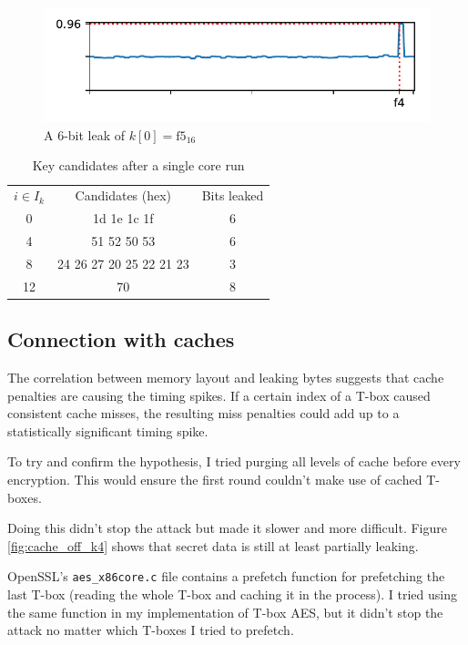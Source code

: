 \documentclass[thesis=B,english]{FITthesis}[2019/03/06]
\begin{document}
\begin{figure}
	\centering
	\includegraphics{broad_pool_example.pdf}
	\caption{A 6-bit leak of $k[0] = \text{f5}_{16}$}
	\label{fig:limited_corr_byte}
\end{figure}

\begin{table}
	\centering
	\begin{tabular}{c|c|c}
		$i \in I_k$ & Candidates (hex) & Bits leaked \\
		0 & 1d 1e 1c 1f & 6 \\
		4 & 51 52 50 53 & 6 \\
		8 & 24 26 27 20 25 22 21 23 & 3 \\
		12 & 70 & 8
	\end{tabular}
	
	\caption{Key candidates after a single core run}
	\label{tbl:leaking_bits}
\end{table}

\subsection{Connection with caches}
The correlation between memory layout and leaking bytes suggests that cache penalties are causing the timing spikes.
If a certain index of a T-box caused consistent cache misses, the resulting miss penalties could add up to a statistically significant timing spike.

To try and confirm the hypothesis, I tried purging all levels of cache before every encryption.
This would ensure the first round couldn't make use of cached T-boxes.

Doing this didn't stop the attack but made it slower and more difficult. 
Figure \ref{fig:cache_off_k4} shows that secret data is still at least partially leaking.

OpenSSL's \verb'aes_x86core.c' file contains a prefetch function for prefetching the last T-box (reading the whole T-box and caching it in the process).
I tried using the same function in my implementation of T-box AES, but it didn't stop the attack no matter which T-boxes I tried to prefetch.
\end{document}
